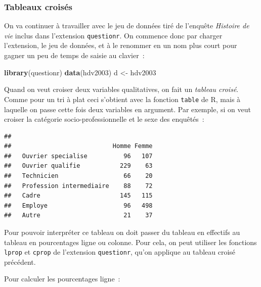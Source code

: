 \documentclass[12pt,]{book}
\newenvironment{Shaded}{\begin{snugshade}}{\end{snugshade}}
\newcommand{\KeywordTok}[1]{\textcolor[rgb]{0.13,0.29,0.53}{\textbf{#1}}}
\newcommand{\NormalTok}[1]{#1}
\newcommand{\OperatorTok}[1]{\textcolor[rgb]{0.81,0.36,0.00}{\textbf{#1}}}
\newcommand{\StringTok}[1]{\textcolor[rgb]{0.31,0.60,0.02}{#1}}
\begin{document}
\hypertarget{tableaux-croisuxe9s}{%
\subsubsection{Tableaux croisés}\label{tableaux-croisuxe9s}}

On va continuer à travailler avec le jeu de données tiré de l'enquête \emph{Histoire de vie} inclus dans l'extension \texttt{questionr}. On commence donc par charger l'extension, le jeu de données, et à le renommer en un nom plus court pour gagner un peu de temps de saisie au clavier~:

\begin{Shaded}
\begin{Highlighting}[]
\KeywordTok{library}\NormalTok{(questionr)}
\KeywordTok{data}\NormalTok{(hdv2003)}
\NormalTok{d <-}\StringTok{ }\NormalTok{hdv2003}
\end{Highlighting}
\end{Shaded}

Quand on veut croiser deux variables qualitatives, on fait un \emph{tableau croisé}. Comme pour un tri à plat ceci s'obtient avec la fonction \texttt{table} de R, mais à laquelle on passe cette fois deux variables en argument. Par exemple, si on veut croiser la catégorie socio-professionnelle et le sexe des enquêtés~:

\begin{Shaded}
\end{Shaded}

\begin{verbatim}
##                           
##                            Homme Femme
##   Ouvrier specialise          96   107
##   Ouvrier qualifie           229    63
##   Technicien                  66    20
##   Profession intermediaire    88    72
##   Cadre                      145   115
##   Employe                     96   498
##   Autre                       21    37
\end{verbatim}

Pour pouvoir interpréter ce tableau on doit passer du tableau en effectifs au tableau en pourcentages ligne ou colonne. Pour cela, on peut utiliser les fonctions \texttt{lprop} et \texttt{cprop} de l'extension \texttt{questionr}, qu'on applique au tableau croisé précédent.

Pour calculer les pourcentages ligne~:
\end{document}
